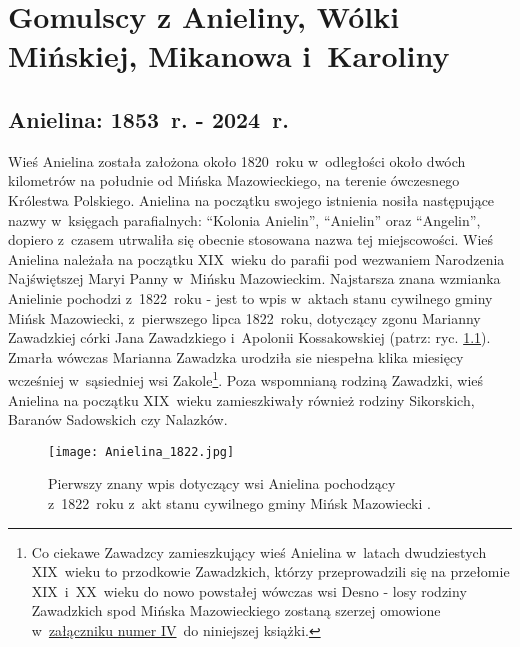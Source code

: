 \chapter{Gomulscy z Anieliny, Wólki Mińskiej, Mikanowa i~Karoliny}



\section{Anielina: 1853~r. - 2024~r.}

Wieś Anielina została założona około 1820~roku w~odległości około dwóch 
kilometrów na południe od Mińska Mazowieckiego, na terenie ówczesnego 
Królestwa Polskiego. Anielina na początku swojego istnienia nosiła 
następujące nazwy w~księgach parafialnych: \enquote{Kolonia Anielin}, 
\enquote{Anielin} oraz \enquote{Angelin}, dopiero z~czasem utrwaliła 
się obecnie stosowana nazwa tej miejscowości. Wieś Anielina należała na 
początku XIX~wieku do parafii pod wezwaniem Narodzenia Najświętszej Maryi 
Panny w~Mińsku Mazowieckim. Najstarsza znana wzmianka Anielinie pochodzi 
z~1822~roku - jest to wpis w~aktach stanu cywilnego gminy Mińsk Mazowiecki, 
z~pierwszego lipca 1822~roku, dotyczący zgonu Marianny Zawadzkiej córki Jana 
Zawadzkiego i~Apolonii Kossakowskiej (patrz: ryc. \ref{fig:anielina_1822}). 
Zmarła wówczas Marianna Zawadzka urodziła sie niespełna klika miesięcy 
wcześniej w~sąsiedniej wsi Zakole\footnote{Co ciekawe Zawadzcy zamieszkujący 
wieś Anielina w~latach dwudziestych XIX~wieku to przodkowie Zawadzkich, 
którzy przeprowadzili się na przełomie XIX~i~XX~wieku do nowo powstałej 
wówczas wsi Desno - losy rodziny Zawadzkich spod Mińska Mazowieckiego zostaną 
szerzej omowione w~\hyperref[sec:zawadzcy]{załączniku numer IV}~do niniejszej 
książki.}. Poza wspomnianą rodziną Zawadzki, wieś Anielina na początku 
XIX~wieku zamieszkiwały również rodziny Sikorskich, Baranów Sadowskich czy 
Nalazków.

\begin{figure}[!ht]
    \vspace*{0.5cm}
    \centering \texttt{[image: 
        Anielina\_1822.jpg]}
    \captionsetup{format=hang}
    \caption{Pierwszy znany wpis dotyczący wsi Anielina pochodzący 
    z~1822~roku z~akt stanu cywilnego gminy Mińsk Mazowiecki 
    \cite{par_minsk1}.}
    \label{fig:anielina_1822}
\end{figure}



